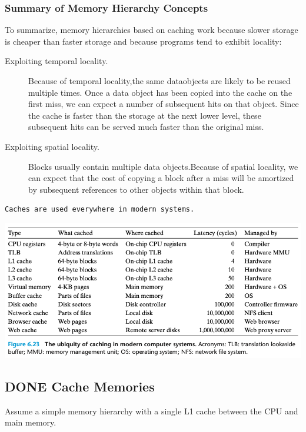 \documentclass[11pt]{article}
\begin{document}
\subsubsection{Summary of Memory Hierarchy Concepts}
\label{sec:orgb392446}
To summarize, memory hierarchies based on caching work because slower storage is cheaper than faster storage and because programs tend to exhibit locality:\\
\begin{description}
\item[{Exploiting temporal locality.}] Because of temporal locality,the same dataobjects are likely to be reused multiple times. Once a data object has been copied into the cache on the first miss, we can expect a number of subsequent hits on that object. Since the cache is faster than the storage at the next lower level, these subsequent hits can be served much faster than the original miss.\\
\item[{Exploiting spatial locality.}] Blocks usually contain multiple data objects.Because of spatial locality, we can expect that the cost of copying a block after a miss will be amortized by subsequent references to other objects within that block.\\
\end{description}


\begin{verbatim}
Caches are used everywhere in modern systems.
\end{verbatim}

\begin{center}
\includegraphics[width=.9\linewidth]{pics/figure6.23-the-ubiquity-of-caching.png}
\end{center}





\subsection{{\bfseries\sffamily DONE} Cache Memories}
\label{sec:org1874e59}
Assume a simple memory hierarchy with a single L1 cache between the CPU and main memory.\\
\end{document}
